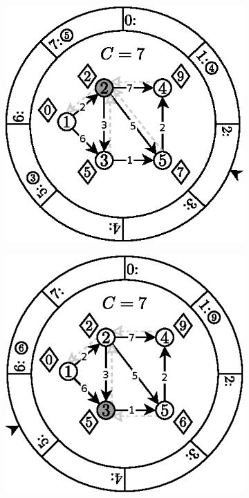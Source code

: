 \begin{figure}[!htbp]
\begin{subfigure}[b]{0.33\textwidth}
		\caption{}
	\end{subfigure}
	\begin{subfigure}[b]{0.33\textwidth}
		\includegraphics[width=\textwidth]{Chapter_II/2/c.eps}
		\caption{}
	\end{subfigure}
	\begin{subfigure}[b]{0.33\textwidth}
		\includegraphics[width=\textwidth]{Chapter_II/2/d.eps}

\end{subfigure}
\end{figure}

